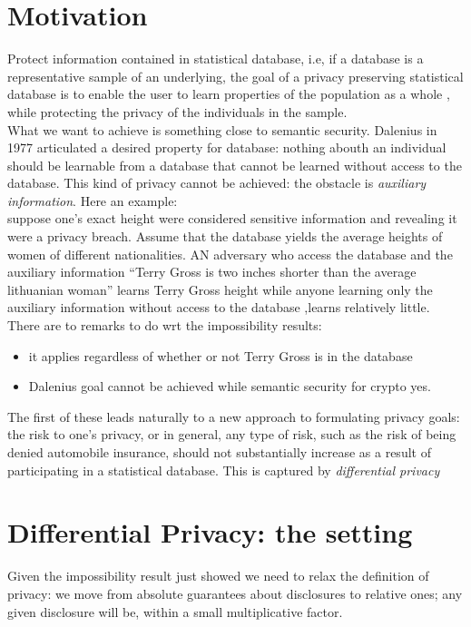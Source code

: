 \documentclass{article}
\begin{document}
\section{Motivation}
Protect information contained in statistical database, i.e, if a database is a representative sample of an underlying, the goal of a privacy preserving statistical database is to enable the user to learn properties of the population as a whole , while protecting the privacy of the individuals in the sample.\\
What we want to achieve is something close to semantic security. Dalenius in 1977 articulated a desired property for database: nothing abouth an individual should be learnable from a database that cannot be learned without access to the database. This kind of privacy cannot be achieved: the obstacle is \textit{auxiliary information}. Here an example:\\
suppose one's exact height were considered sensitive information and revealing it were a privacy breach. Assume that the database yields the average heights of women of different nationalities. AN adversary who access the database and the auxiliary information ``Terry Gross is two inches shorter than the average lithuanian woman'' learns Terry Gross height while anyone learning only the auxiliary information without access to the database ,learns relatively little.\\
There are to remarks to do wrt the impossibility results:\\
\begin{itemize}
\item it applies regardless of whether or not Terry Gross is in the database
\item Dalenius goal cannot be achieved while semantic security for crypto yes.
\end{itemize}

The first of these
leads naturally to a new approach to formulating privacy goals: the risk to one’s
privacy, or in general, any type of risk, such as the risk of being denied automobile
insurance, should not substantially increase as a result of participating in a
statistical database. This is captured by \textit{differential privacy}

\section{Differential Privacy: the setting}
Given the impossibility result just showed we need to relax the definition of privacy: we move from absolute guarantees about disclosures to relative ones; any given disclosure will be, within  a small multiplicative factor.
\end{document}
